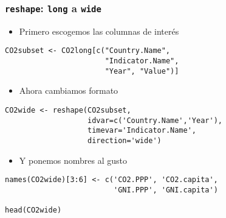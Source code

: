 \documentclass[xcolor={usenames,svgnames,dvipsnames}]{beamer}
\begin{document}
\begin{frame}[fragile]
\frametitle{\texttt{reshape}: \texttt{long} a \texttt{wide}}
\label{sec-4-3}

\begin{itemize}
\item Primero escogemos las columnas de interés
\end{itemize}

\lstset{language=R}
\begin{lstlisting}
CO2subset <- CO2long[c("Country.Name",
                       "Indicator.Name",
                       "Year", "Value")]
\end{lstlisting}
\begin{itemize}
\item Ahora cambiamos formato
\end{itemize}

\lstset{language=R}
\begin{lstlisting}
CO2wide <- reshape(CO2subset,
                   idvar=c('Country.Name','Year'),
                   timevar='Indicator.Name',
                   direction='wide')
\end{lstlisting}
\begin{itemize}
\item Y ponemos nombres al gusto
\end{itemize}

\lstset{language=R}
\begin{lstlisting}
names(CO2wide)[3:6] <- c('CO2.PPP', 'CO2.capita',
                         'GNI.PPP', 'GNI.capita')

head(CO2wide)
\end{lstlisting}

  
  
  
  
  
  
  
\end{frame}
\end{document}
